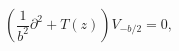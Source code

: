 \begin{equation}
\left(\frac{1}{b^{2}}\partial^{2}+T(z)\right)V_{-b/2}=0, \nonumber
\end{equation}

